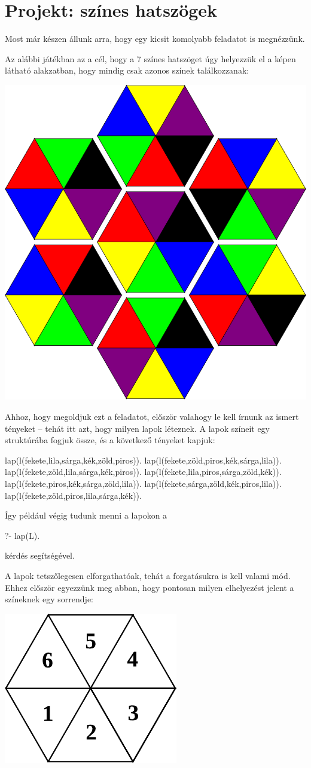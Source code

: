 \section{Projekt: színes hatszögek}
Most már készen állunk arra, hogy egy kicsit
komolyabb feladatot is megnézzünk.

Az alábbi játékban az a cél, hogy a 7 színes
hatszöget úgy helyezzük el a képen látható
alakzatban, hogy mindig csak azonos színek
találkozzanak:
\begin{center}
  \includegraphics[width=.8\textwidth]{images/hexagons.pdf}
\end{center}

Ahhoz, hogy megoldjuk ezt a feladatot, először
valahogy le kell írnunk az ismert tényeket -- tehát
itt azt, hogy milyen lapok léteznek. A lapok színeit
egy  struktúrába fogjuk össze, és a következő
tényeket kapjuk:
\begin{program}
lap(l(fekete,lila,sárga,kék,zöld,piros)).
lap(l(fekete,zöld,piros,kék,sárga,lila)).
lap(l(fekete,zöld,lila,sárga,kék,piros)).
lap(l(fekete,lila,piros,sárga,zöld,kék)).
lap(l(fekete,piros,kék,sárga,zöld,lila)).
lap(l(fekete,sárga,zöld,kék,piros,lila)).
lap(l(fekete,zöld,piros,lila,sárga,kék)).
\end{program}

Így például végig tudunk menni a lapokon a
\begin{query}
?- lap(L).
\end{query}
kérdés segítségével.

A lapok tetszőlegesen elforgathatóak, tehát a forgatásukra is kell valami mód. Ehhez először egyezzünk meg abban, hogy pontosan milyen elhelyezést jelent a színeknek egy sorrendje:
\begin{center}
  \includegraphics[width=.3\textwidth]{images/hexagon.pdf}
\end{center}

